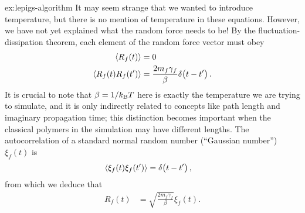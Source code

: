\begin{DefAnswer}{ex:lepigs-algorithm}
	It may seem strange that we wanted to introduce temperature, but there is no mention of temperature in these equations.
	However, we have not yet explained what the random force needs to be!
	By the fluctuation-dissipation theorem, each element of the random force vector must obey~\cite[5-6]{zwanzig2001nonequilibrium}
	\begin{subequations}
	\begin{align}
		\langle R_f(t) \rangle
		&= 0 \\
		\langle R_f(t) R_f(t') \rangle
		&= \frac{2 m_f \gamma_f}{\beta} \delta\!\left( t - t' \right).
	\end{align}
	\end{subequations}
	It is crucial to note that $\beta = 1/k_\mathrm{B} T$ here is exactly the temperature we are trying to simulate, and it is only indirectly related to concepts like path length and imaginary propagation time; this distinction becomes important when the classical polymers in the simulation may have different lengths.
	The autocorrelation of a standard normal random number (``Gaussian number'') $\xi_f(t)$ is~\cite{ceriotti2010efficient}
	\begin{align}
		\langle \xi_f(t) \xi_f(t') \rangle
		&= \delta\!\left( t - t' \right),
	\end{align}
	from which we deduce that
	\begin{align}
		R_f(t)
		&= \sqrt{\frac{2 m_f \gamma_f}{\beta}} \xi_f(t).
	\end{align}


\end{DefAnswer}
